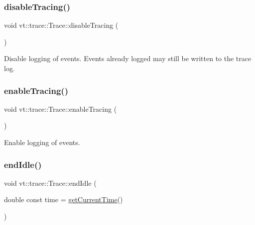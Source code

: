 \mbox{\label{structvt_1_1trace_1_1_trace_a54f34dbcf8960de7b319e44ef9b76eb0}} 
\subsubsection{\texorpdfstring{disable\+Tracing()}{disableTracing()}}
{\footnotesize\ttfamily void vt\+::trace\+::\+Trace\+::disable\+Tracing (\begin{DoxyParamCaption}{ }\end{DoxyParamCaption})}

Disable logging of events. Events already logged may still be written to the trace log. \mbox{\label{structvt_1_1trace_1_1_trace_ae7ef14764ce87e0ea8baf802db400066}} 
\subsubsection{\texorpdfstring{enable\+Tracing()}{enableTracing()}}
{\footnotesize\ttfamily void vt\+::trace\+::\+Trace\+::enable\+Tracing (\begin{DoxyParamCaption}{ }\end{DoxyParamCaption})}



Enable logging of events. 

\mbox{\label{structvt_1_1trace_1_1_trace_a0262f4025460c9d61cac60420e75ef77}} 
\subsubsection{\texorpdfstring{end\+Idle()}{endIdle()}}
{\footnotesize\ttfamily void vt\+::trace\+::\+Trace\+::end\+Idle (\begin{DoxyParamCaption}\item[{double const}]{time = {\ttfamily \hyperlink{structvt_1_1trace_1_1_trace_a04cf6b76b4ced1bc90d246a34c948db5}{get\+Current\+Time}()} }\end{DoxyParamCaption})}

